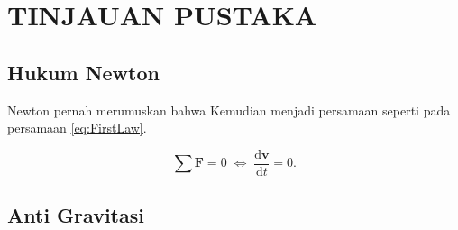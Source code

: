 \section{TINJAUAN PUSTAKA}


\subsection{Hukum Newton}

Newton pernah merumuskan \citep{Newton1687} bahwa \lipsum[8]
Kemudian menjadi persamaan seperti pada persamaan \ref{eq:FirstLaw}.

\begin{equation}
  \label{eq:FirstLaw}
  \sum \mathbf{F} = 0\; \Leftrightarrow\; \frac{\mathrm{d} \mathbf{v} }{\mathrm{d}t} = 0.
\end{equation}

\subsection{Anti Gravitasi}

\lipsum[9]